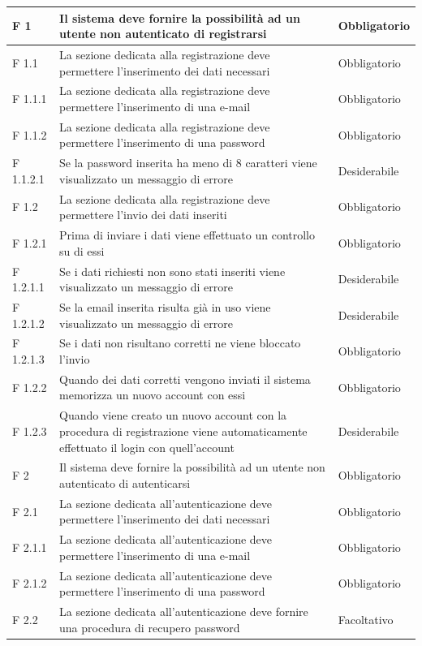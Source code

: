 \documentclass[a4paper,11pt]{article}
\begin{document}
\begin{longtable}{p{}p{}p{}}
F 1 & Il sistema deve fornire la possibilità ad un utente non autenticato di registrarsi & Obbligatorio\\
\midrule
F 1.1 & La sezione dedicata alla registrazione deve permettere l'inserimento dei dati necessari & Obbligatorio\\
\midrule
F 1.1.1 & La sezione dedicata alla registrazione deve permettere l'inserimento di una e-mail & Obbligatorio\\
\midrule
F 1.1.2 & La sezione dedicata alla registrazione deve permettere l'inserimento di una password & Obbligatorio\\
\midrule
F 1.1.2.1 & Se la password inserita ha meno di 8 caratteri viene visualizzato un messaggio di errore & Desiderabile\\
\midrule
F 1.2 & La sezione dedicata alla registrazione deve permettere l'invio dei dati inseriti & Obbligatorio\\
\midrule
F 1.2.1 & Prima di inviare i dati viene effettuato un controllo su di essi & Obbligatorio\\
\midrule
F 1.2.1.1 & Se i dati richiesti non sono stati inseriti viene visualizzato un messaggio di errore & Desiderabile\\
\midrule
F 1.2.1.2 & Se la email inserita risulta già in uso viene visualizzato un messaggio di errore & Desiderabile\\
\midrule
F 1.2.1.3 & Se i dati non risultano corretti ne viene bloccato l'invio & Obbligatorio\\
\midrule
F 1.2.2 & Quando dei dati corretti vengono inviati il sistema memorizza un nuovo account con essi & Obbligatorio\\
\midrule
F 1.2.3 & Quando viene creato un nuovo account con la procedura di registrazione viene automaticamente effettuato il login con quell'account & Desiderabile\\
\midrule
F 2 & Il sistema deve fornire la possibilità ad un utente non autenticato di autenticarsi & Obbligatorio\\
\midrule
F 2.1 & La sezione dedicata all'autenticazione deve permettere l'inserimento dei dati necessari & Obbligatorio\\
\midrule
F 2.1.1 & La sezione dedicata all'autenticazione deve permettere l'inserimento di una e-mail & Obbligatorio\\
\midrule
F 2.1.2 & La sezione dedicata all'autenticazione deve permettere l'inserimento di una password & Obbligatorio\\
\midrule
F 2.2 & La sezione dedicata all'autenticazione deve fornire una procedura di recupero password & Facoltativo\\

\end{longtable}
\end{document}

